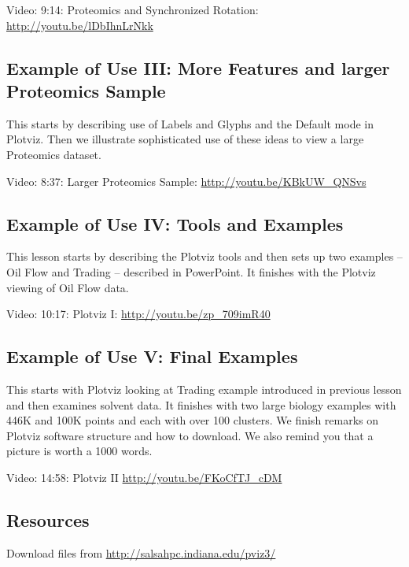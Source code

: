 Video: 9:14: Proteomics and Synchronized Rotation:
\url{http://youtu.be/lDbIhnLrNkk}

\subsection{Example of Use III: More Features and larger Proteomics
Sample}\label{example-of-use-iii-more-features-and-larger-proteomics-sample}

This starts by describing use of Labels and Glyphs and the Default mode
in Plotviz. Then we illustrate sophisticated use of these ideas to view
a large Proteomics dataset.

Video: 8:37: Larger Proteomics Sample: \url{http://youtu.be/KBkUW_QNSvs}

\subsection{Example of Use IV: Tools and
Examples}\label{example-of-use-iv-tools-and-examples}

This lesson starts by describing the Plotviz tools and then sets up two
examples -- Oil Flow and Trading -- described in PowerPoint. It finishes
with the Plotviz viewing of Oil Flow data.

Video: 10:17: Plotviz I: \url{http://youtu.be/zp_709imR40}

\subsection{Example of Use V: Final
Examples}\label{example-of-use-v-final-examples}

This starts with Plotviz looking at Trading example introduced in
previous lesson and then examines solvent data. It finishes with two
large biology examples with 446K and 100K points and each with over 100
clusters. We finish remarks on Plotviz software structure and how to
download. We also remind you that a picture is worth a 1000 words.

Video: 14:58: Plotviz II \url{http://youtu.be/FKoCfTJ_cDM}

\subsection{Resources}\label{resources}

Download files from \url{http://salsahpc.indiana.edu/pviz3/}

